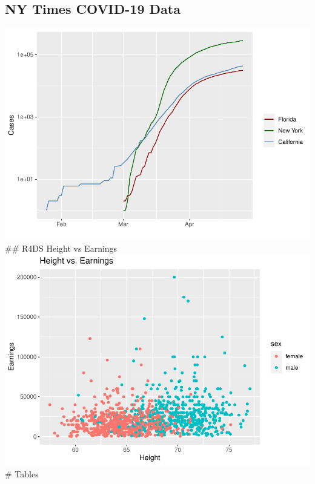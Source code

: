 \documentclass[
]{article}
\begin{document}
\hypertarget{ny-times-covid-19-data}{%
\subsection{NY Times COVID-19 Data}\label{ny-times-covid-19-data}}

\includegraphics{assignment_04_SyversonLuke_files/figure-latex/unnamed-chunk-2-1.pdf}
\#\# R4DS Height vs Earnings
\includegraphics{assignment_04_SyversonLuke_files/figure-latex/unnamed-chunk-3-1.pdf}
\# Tables
\end{document}
